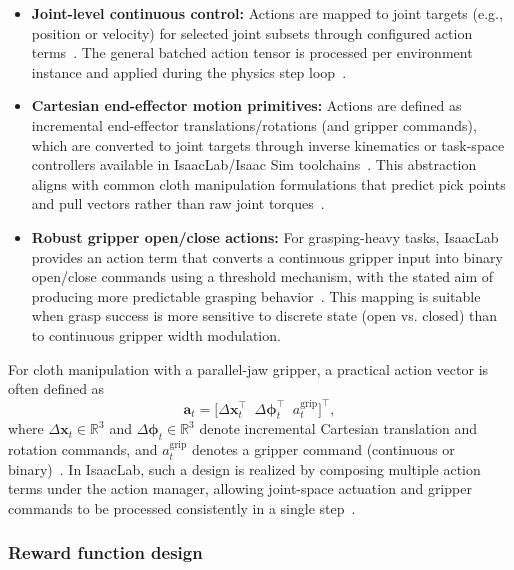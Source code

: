 \begin{itemize}
    \item \textbf{Joint-level continuous control:} Actions are mapped to joint targets (e.g., position or velocity) for selected joint subsets through configured action terms~\cite{isaaclab_mdp_terms_api}. The general batched action tensor is processed per environment instance and applied during the physics step loop~\cite{isaaclab_envs_api}.
    \item \textbf{Cartesian end-effector motion primitives:} Actions are defined as incremental end-effector translations/rotations (and gripper commands), which are converted to joint targets through inverse kinematics or task-space controllers available in IsaacLab/Isaac Sim toolchains~\cite{NVIDIA2025IsaacLab,isaaclab_task_design_workflows}. This abstraction aligns with common cloth manipulation formulations that predict pick points and pull vectors rather than raw joint torques~\cite{Seita2020FabricSmoothing}.
    \item \textbf{Robust gripper open/close actions:} For grasping-heavy tasks, IsaacLab provides an action term that converts a continuous gripper input into binary open/close commands using a threshold mechanism, with the stated aim of producing more predictable grasping behavior~\cite{isaaclab_mdp_terms_api}. This mapping is suitable when grasp success is more sensitive to discrete state (open vs. closed) than to continuous gripper width modulation.
\end{itemize}

For cloth manipulation with a parallel-jaw gripper, a practical action vector is often defined as
\[
\mathbf{a}_t = \bigl[\Delta \mathbf{x}_t^\top \;\; \Delta \boldsymbol{\phi}_t^\top \;\; a^{\text{grip}}_t\bigr]^\top,
\]
where $\Delta \mathbf{x}_t \in \mathbb{R}^3$ and $\Delta \boldsymbol{\phi}_t \in \mathbb{R}^3$ denote incremental Cartesian translation and rotation commands, and $a^{\text{grip}}_t$ denotes a gripper command (continuous or binary)~\cite{Seita2020FabricSmoothing,isaaclab_mdp_terms_api}. In IsaacLab, such a design is realized by composing multiple action terms under the action manager, allowing joint-space actuation and gripper commands to be processed consistently in a single step~\cite{isaaclab_managers_api,isaaclab_task_design_workflows}.

\subsubsection{Reward function design}

